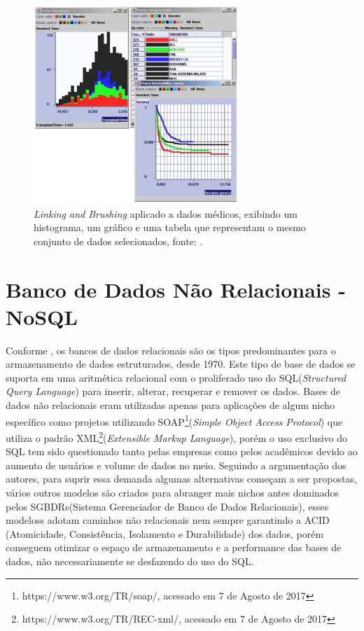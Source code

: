 \documentclass[article,11pt,oneside,a4paper]{abntex2} %
\begin{document}
	\begin{figure}[!htb]
		{\centering
			\includegraphics[width=\linewidth/2]{figuras/link_brush.png}
			\caption{\textit{Linking and Brushing} aplicado a dados médicos, exibindo um histograma, um gráfico e uma tabela que representam o mesmo conjunto de dados selecionados, fonte: \cite{kosara2003interaction}.}
			\label{link_brush}
		}
	\end{figure}	

	\section{Banco de Dados Não Relacionais - NoSQL}	
	\hspace{13pt}
	Conforme , os bancos de dados relacionais são os tipos predominantes para o armazenamento de dados estruturados, desde 1970. Este tipo de base de dados se suporta em uma aritmética relacional com o proliferado uso do SQL(\textit{Structured Query Language}) para inserir, alterar, recuperar e remover os dados. Bases de dados não relacionais eram utilizadas apenas para aplicações de algum nicho específico como projetos utilizando SOAP\footnote{https://www.w3.org/TR/soap/, acessado em 7 de Agosto de 2017}(\textit{Simple Object Access Protocol}) que utiliza o padrão XML\footnote{https://www.w3.org/TR/REC-xml/, acessado em 7 de Agosto de 2017}(\textit{Extensible Markup Language}), porém o uso exclusivo do SQL tem sido questionado tanto pelas empresas como pelos acadêmicos devido ao aumento de usuários e volume de dados no meio. Seguindo a argumentação dos autores, para suprir essa demanda algumas alternativas começam a ser propostas, vários outros modelos são criados para abranger mais nichos antes dominados pelos SGBDRs(Sistema Gerenciador de Banco de Dados Relacionais), esses modeloss adotam caminhos não relacionais nem sempre garantindo a ACID (Atomicidade, Consistência, Isolamento e Durabilidade) dos dados, porém conseguem otimizar o espaço de armazenamento e a performance das bases de dados, não necessariamente se desfazendo do uso do SQL.
	
\end{document}
